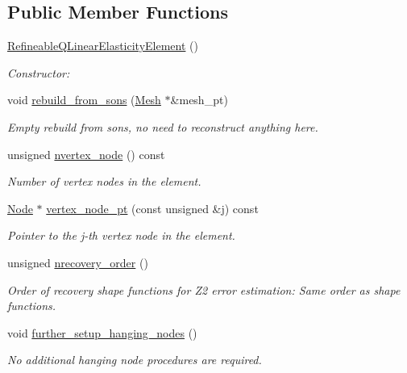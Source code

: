 \subsection*{Public Member Functions}
\begin{DoxyCompactItemize}
\item 
\hyperlink{classoomph_1_1RefineableQLinearElasticityElement_a869786d1cc68db07a17d8a5b44cfd0a6}{Refineable\+Q\+Linear\+Elasticity\+Element} ()
\begin{DoxyCompactList}\small\item\em Constructor\+: \end{DoxyCompactList}\item 
void \hyperlink{classoomph_1_1RefineableQLinearElasticityElement_a700c92182b25ecdda8c4454efd347c58}{rebuild\+\_\+from\+\_\+sons} (\hyperlink{classoomph_1_1Mesh}{Mesh} $\ast$\&mesh\+\_\+pt)
\begin{DoxyCompactList}\small\item\em Empty rebuild from sons, no need to reconstruct anything here. \end{DoxyCompactList}\item 
unsigned \hyperlink{classoomph_1_1RefineableQLinearElasticityElement_a9d830361d2e7c275ff4adda026f70c00}{nvertex\+\_\+node} () const
\begin{DoxyCompactList}\small\item\em Number of vertex nodes in the element. \end{DoxyCompactList}\item 
\hyperlink{classoomph_1_1Node}{Node} $\ast$ \hyperlink{classoomph_1_1RefineableQLinearElasticityElement_ac2b4e5b6485c01414063e1a05ab8da20}{vertex\+\_\+node\+\_\+pt} (const unsigned \&j) const
\begin{DoxyCompactList}\small\item\em Pointer to the j-\/th vertex node in the element. \end{DoxyCompactList}\item 
unsigned \hyperlink{classoomph_1_1RefineableQLinearElasticityElement_a79d93d3bf7c5bcf54537eeb900ee4404}{nrecovery\+\_\+order} ()
\begin{DoxyCompactList}\small\item\em Order of recovery shape functions for Z2 error estimation\+: Same order as shape functions. \end{DoxyCompactList}\item 
void \hyperlink{classoomph_1_1RefineableQLinearElasticityElement_a2e72b739f026bfdb6aac2d7d72092679}{further\+\_\+setup\+\_\+hanging\+\_\+nodes} ()
\begin{DoxyCompactList}\small\item\em No additional hanging node procedures are required. \end{DoxyCompactList}\end{DoxyCompactItemize}
